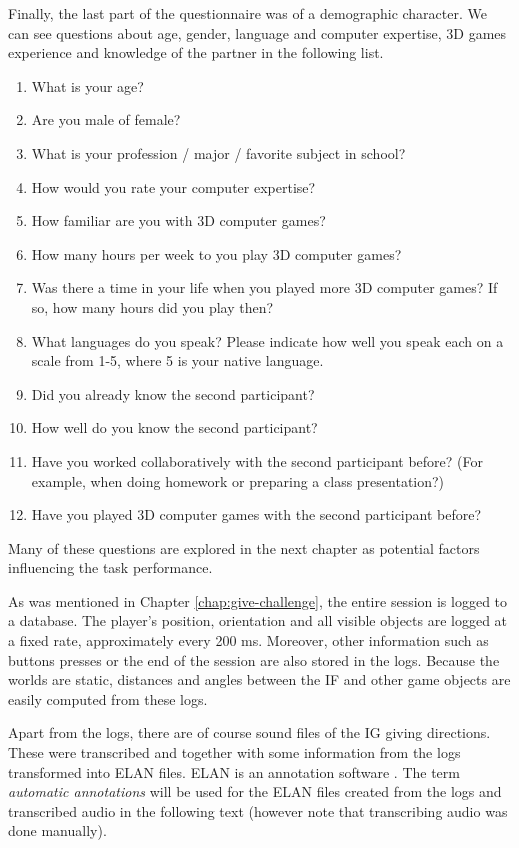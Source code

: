 Finally, the last part of the questionnaire was of a demographic character. We can see questions about age, gender, language and computer expertise, 3D games experience and knowledge of the partner in the following list.

\begin{enumerate}
\item
What is your age?
\item
Are you male of female?
\item
What is your profession / major / favorite subject in school?
\item
How would you rate your computer expertise?
\item
How familiar are you with 3D computer games?
\item
How many hours per week to you play 3D computer games?
\item
Was there a time in your life when you played more 3D computer games? If so, how many hours did you play then?
\item
What languages do you speak? Please indicate how well you speak each on a scale from 1-5, where 5 is your native language.
\item
Did you already know the second participant?
\item
How well do you know the second participant?
\item
Have you worked collaboratively with the second participant before? (For example, when doing homework or preparing a class presentation?)
\item
Have you played 3D computer games with the second participant before?
\end{enumerate}

Many of these questions are explored in the next chapter as potential factors influencing the task performance. 

As was mentioned in Chapter \ref{chap:give-challenge}, the entire session is logged to a database. The player's position, orientation and all visible objects are logged at a fixed rate, approximately every 200 ms. Moreover, other information such as buttons presses or the end of the session are also stored in the logs. Because the worlds are static, distances and angles between the IF and other game objects are easily computed from these logs.

Apart from the logs, there are of course sound files of the IG giving directions. These were transcribed and together with some information from the logs transformed into ELAN files. ELAN is an annotation software \citep{sloetjes2008annotation}. The term \textit{automatic annotations} will be used for the ELAN files created from the logs and transcribed audio in the following text (however note that transcribing audio was done manually). 

